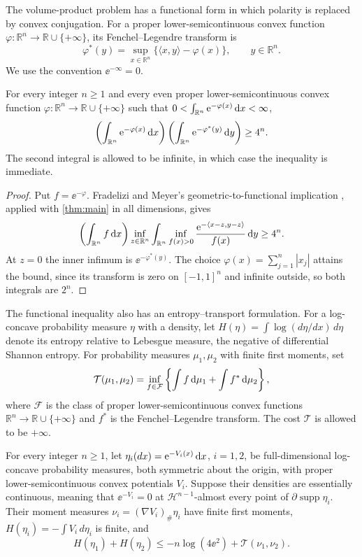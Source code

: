 The volume-product problem has a functional form in which polarity is replaced by convex conjugation. For a proper lower-semicontinuous convex function $\varphi:\mathbb{R}^n\to\mathbb{R}\cup\{+\infty\}$, its Fenchel--Legendre transform is
\[
 \varphi^*(y)=\sup_{x\in\mathbb{R}^n}\{\langle x,y\rangle-\varphi(x)\},
 \qquad y\in\mathbb{R}^n.
\]
We use the convention $\ee^{-\infty}=0$.

\begin{corollary}\label{cor:functional-mahler}
For every integer $n\ge1$ and every even proper lower-semicontinuous convex function $\varphi:\mathbb{R}^n\to\mathbb{R}\cup\{+\infty\}$ such that $0<\int_{\mathbb{R}^n}\mathrm{e}^{-\varphi(x)}\,\mathrm{d} x<\infty$,
\[
 \left(\int_{\mathbb{R}^n}\mathrm{e}^{-\varphi(x)}\,\mathrm{d} x\right)
 \left(\int_{\mathbb{R}^n}\mathrm{e}^{-\varphi^*(y)}\,\mathrm{d} y\right)\ge4^n.
\]
The second integral is allowed to be infinite, in which case the inequality is immediate.
\end{corollary}

\begin{proof}
Put $f=\ee^{-\varphi}$. Fradelizi and Meyer's geometric-to-functional implication \cite[Proposition~1(a)]{FradeliziMeyer2008}, applied with \cref{thm:main} in all dimensions, gives
\[
 \left(\int_{\mathbb{R}^n} f\,\mathrm{d} x\right)
 \inf_{z\in\mathbb{R}^n}\int_{\mathbb{R}^n}
 \inf_{f(x)>0}\frac{\mathrm{e}^{-\langle x-z,y-z\rangle}}{f(x)}\,\mathrm{d} y\geq4^n.
\]
At $z=0$ the inner infimum is $\ee^{-\varphi^*(y)}$. The choice $\varphi(x)=\sum_{j=1}^n |x_j|$ attains the bound, since its transform is zero on $[-1,1]^n$ and infinite outside, so both integrals are $2^n$.
\end{proof}

The functional inequality also has an entropy--transport formulation. For a log-concave probability measure $\eta$ with a density, let $H(\eta)=\int\log(d\eta/dx)\,d\eta$ denote its entropy relative to Lebesgue measure, the negative of differential Shannon entropy. For probability measures $\mu_1,\mu_2$ with finite first moments, set
\[
 \mathcal{T}(\mu_1,\mu_2)=
 \inf_{f\in\mathcal{F}}\left\{\int f\,\mathrm{d} \mu_1+\int f^*\,\mathrm{d} \mu_2\right\},
\]
where $\mathcal{F}$ is the class of proper lower-semicontinuous convex functions $\mathbb{R}^n\to\mathbb{R}\cup\{+\infty\}$ and $f^*$ is the Fenchel--Legendre transform. The cost $\mathcal{T}$ is allowed to be $+\infty$.

\begin{corollary}\label{cor:entropy-transport}
For every integer $n\ge1$, let $\eta_i(dx)=\mathrm{e}^{-V_i(x)}\,\mathrm{d} x$, $i=1,2$, be full-dimensional log-concave probability measures, both symmetric about the origin, with proper lower-semicontinuous convex potentials $V_i$. Suppose their densities are essentially continuous, meaning that $\ee^{-V_i}=0$ at $\mathcal{H}^{n-1}$-almost every point of $\partial\operatorname{supp}\eta_i$. Their moment measures $\nu_i=(\nabla V_i)_\#\eta_i$ have finite first moments, $H(\eta_i)=-\int V_i\,d\eta_i$ is finite, and
\[
 H(\eta_1)+H(\eta_2)\le -n\log(4\ee^2)+\mathcal{T}(\nu_1,\nu_2).
\]
\end{corollary}

